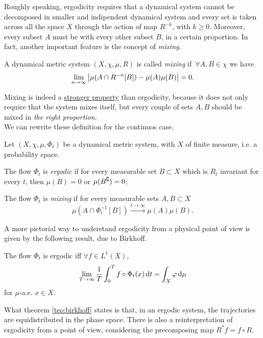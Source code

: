 Roughly speaking, ergodicity requires that a dynamical system cannot be decomposed in smaller and indipendent dynamical system and every set is taken across all the space $X$ through the action of map $R^{-k}$, with $k\geq0$. Moreover, every subset $A$ must be  with every other subset $B$, in a certain proportion. In fact, another important feature is the concept of \emph{mixing}. 

\begin{defin}[Mixing]
\label{defin:mixing_discrete}
A dynamical metric system $(X,\chi,\mu,R)$ is called \emph{mixing} if $\,\forall A,B\in\chi$ we have
\[
\lim_{n\to\infty}\left| \mu(A\cap R^{-n}[B])-\mu(A)\mu(B)\right|=0.
\]
\end{defin}

Mixing is indeed a \underline{stronger property} than ergodicity, because it does not only require that the system mixes itself, but every couple of sets $A,B$ should be mixed in \emph{the right proportion}.\\
We can rewrite these definition for the continuos case.

\begin{defin}
\label{defin:ergodic_mixing_contin}
Let $(X,\chi,\mu,\Phi_{t})$ be a dynamical metric system, with $X$ of finite measure, i.e. a probability space.
\begin{compactitem}
\item The flow $\Phi_{t}$ is \emph{ergodic} if for every measurable set $B\subset X$ which is $R_{t}$ invariant for every $t$, then $\mu(B)=0$ or $\mu(B^{\complement})=0$;
\item The flow $\Phi_{t}$ is \emph{mixing} if for every measurable sets $A,B\subset X$
\[
\mu(A\cap\Phi_{t}^{-1}[B])\stackrel{t\to\infty}{\longrightarrow}\mu(A)\mu(B).
\]
\end{compactitem}
\end{defin}

A more pictorial way to understand ergodicity from a physical point of view is given by the following result, due to Birkhoff.

\begin{nteo}[Birkhoff]
\label{teo:birkhoff}
The flow $\Phi_{t}$ is ergodic iff $\forall f\in L^{1}(X)$,
\[
\lim_{T\to\infty}\frac{1}{T}\int_{0}^{T}f\circ\Phi_{t}(x)\mathop{}\!\mathrm{d} t = \int_{X}\varphi \mathop{}\!\mathrm{d}\mu
\]
for $\mu$-a.e. $x\in X$.
\end{nteo}

What theorem \ref{teo:birkhoff} states is that, in an ergodic system, the trajectories are equidistributed in the phase space. There is also a reinterpretation of ergodicity from a  point of view, considering the precomposing map $R^{\ast}f=f\circ R$.

